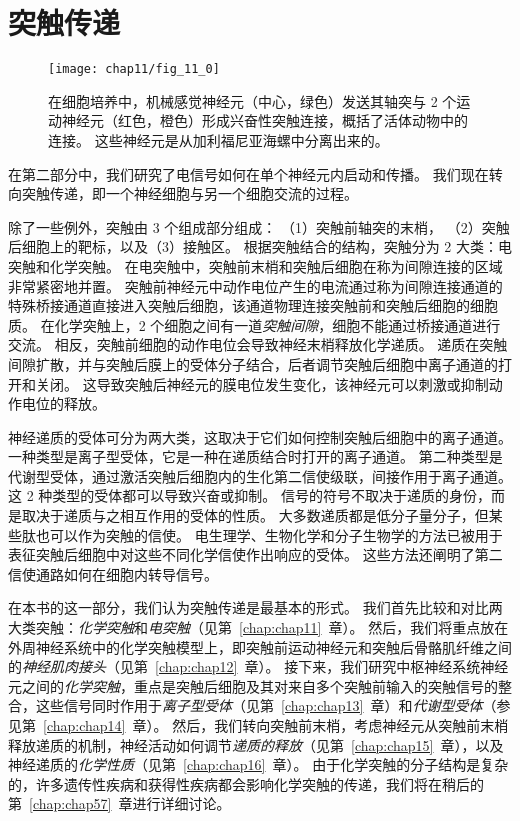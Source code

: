 \part{突触传递}

\begin{figure}[htbp]
	\centering
	\texttt{[image: chap11/fig\_11\_0]}
	\caption{在细胞培养中，机械感觉神经元（中心，绿色）发送其轴突与 2 个运动神经元（红色，橙色）形成兴奋性突触连接，概括了活体动物中的连接。
		这些神经元是从加利福尼亚海螺中分离出来的。}
	\label{fig:11_0}
\end{figure}


在第二部分中，我们研究了电信号如何在单个神经元内启动和传播。
我们现在转向突触传递，即一个神经细胞与另一个细胞交流的过程。


除了一些例外，突触由 3 个组成部分组成：
（1）突触前轴突的末梢，
（2）突触后细胞上的靶标，以及（3）接触区。
根据突触结合的结构，突触分为 2 大类：电突触和化学突触。
在电突触中，突触前末梢和突触后细胞在称为间隙连接的区域非常紧密地并置。
突触前神经元中动作电位产生的电流通过称为间隙连接通道的特殊桥接通道直接进入突触后细胞，该通道物理连接突触前和突触后细胞的细胞质。
在化学突触上，2 个细胞之间有一道\textit{突触间隙}，细胞不能通过桥接通道进行交流。
相反，突触前细胞的动作电位会导致神经末梢释放化学递质。
递质在突触间隙扩散，并与突触后膜上的受体分子结合，后者调节突触后细胞中离子通道的打开和关闭。
这导致突触后神经元的膜电位发生变化，该神经元可以刺激或抑制动作电位的释放。


神经递质的受体可分为两大类，这取决于它们如何控制突触后细胞中的离子通道。
一种类型是离子型受体，它是一种在递质结合时打开的离子通道。
第二种类型是代谢型受体，通过激活突触后细胞内的生化第二信使级联，间接作用于离子通道。
这 2 种类型的受体都可以导致兴奋或抑制。
信号的符号不取决于递质的身份，而是取决于递质与之相互作用的受体的性质。
大多数递质都是低分子量分子，但某些肽也可以作为突触的信使。
电生理学、生物化学和分子生物学的方法已被用于表征突触后细胞中对这些不同化学信使作出响应的受体。
这些方法还阐明了第二信使通路如何在细胞内转导信号。


在本书的这一部分，我们认为突触传递是最基本的形式。
我们首先比较和对比两大类突触：\textit{化学突触}和\textit{电突触}（见第~\ref{chap:chap11}~章）。
然后，我们将重点放在外周神经系统中的化学突触模型上，即突触前运动神经元和突触后骨骼肌纤维之间的\textit{神经肌肉接头}（见第~\ref{chap:chap12}~章）。
接下来，我们研究中枢神经系统神经元之间的\textit{化学突触}，重点是突触后细胞及其对来自多个突触前输入的突触信号的整合，这些信号同时作用于\textit{离子型受体}（见第~\ref{chap:chap13}~章）和\textit{代谢型受体}（参见第~\ref{chap:chap14}~章）。
然后，我们转向突触前末梢，考虑神经元从突触前末梢释放递质的机制，神经活动如何调节\textit{递质的释放}（见第~\ref{chap:chap15}~章），以及神经递质的\textit{化学性质}（见第~\ref{chap:chap16}~章）。
由于化学突触的分子结构是复杂的，许多遗传性疾病和获得性疾病都会影响化学突触的传递，我们将在稍后的第~\ref{chap:chap57}~章进行详细讨论。


